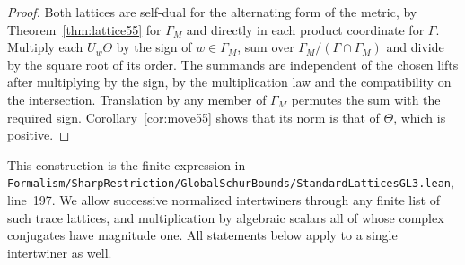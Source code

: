 \documentclass[a4paper,11pt]{article}
\theoremstyle{definition}
\theoremstyle{remark}
\newcommand{\srcloc}[2]{{\small\nolinkurl{#1.lean}}, line~#2}
\numberwithin{equation}{section}
\begin{document}
\begin{proof}
Both lattices are self-dual for the alternating form of the metric,
by Theorem~\ref{thm:lattice55} for \(\Gamma_M\) and directly in
each product coordinate for \(\Gamma\). Multiply each \(U_w\Theta\)
by the sign of \(w\in\Gamma_M\), sum over
\(\Gamma_M/(\Gamma\cap\Gamma_M)\) and divide by the square root
of its order. The summands are independent of the chosen lifts
after multiplying by the sign, by the multiplication law and
the compatibility on the intersection. Translation by any member
of \(\Gamma_M\) permutes the sum with the required sign.
Corollary~\ref{cor:move55} shows that its norm is that of \(\Theta\),
which is positive.
\end{proof}

This construction is the finite expression in
\srcloc{Formalism/SharpRestriction/GlobalSchurBounds/StandardLatticesGL3}{197}.
We allow successive normalized intertwiners through any finite list
of such trace lattices, and multiplication by algebraic scalars all
of whose complex conjugates have magnitude one. All statements below
apply to a single intertwiner as well.
\end{document}
